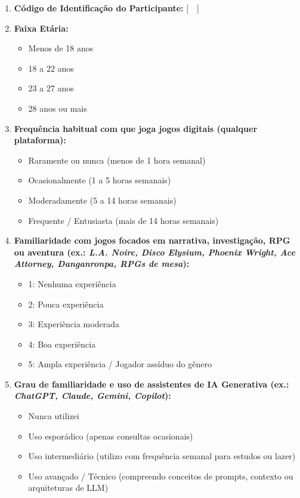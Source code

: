 \begin{enumerate}[label=\textbf{P\arabic*.}, noitemsep, topsep=1pt, parsep=0pt]
    \item \textbf{Código de Identificação do Participante:} [\ \underline{\hspace{4cm}}\ ]
    \item \textbf{Faixa Etária:}
    \begin{itemize}[label={$\square$}, noitemsep, topsep=1pt, parsep=0pt]
        \item Menos de 18 anos
        \item 18 a 22 anos
        \item 23 a 27 anos
        \item 28 anos ou mais
    \end{itemize}
    \item \textbf{Frequência habitual com que joga jogos digitais (qualquer plataforma):}
    \begin{itemize}[label={$\square$}, noitemsep, topsep=1pt, parsep=0pt]
        \item Raramente ou nunca (menos de 1 hora semanal)
        \item Ocasionalmente (1 a 5 horas semanais)
        \item Moderadamente (5 a 14 horas semanais)
        \item Frequente / Entusiasta (mais de 14 horas semanais)
    \end{itemize}
    \item \textbf{Familiaridade com jogos focados em narrativa, investigação, RPG ou aventura (ex.: \textit{L.A. Noire, Disco Elysium, Phoenix Wright, Ace Attorney, Danganronpa, RPGs de mesa}):}
    \begin{itemize}[label={$\square$}, noitemsep, topsep=1pt, parsep=0pt]
        \item 1: Nenhuma experiência
        \item 2: Pouca experiência
        \item 3: Experiência moderada
        \item 4: Boa experiência
        \item 5: Ampla experiência / Jogador assíduo do gênero
    \end{itemize}
    \item \textbf{Grau de familiaridade e uso de assistentes de IA Generativa (ex.: \textit{ChatGPT, Claude, Gemini, Copilot}):}
    \begin{itemize}[label={$\square$}, noitemsep, topsep=1pt, parsep=0pt]
        \item Nunca utilizei
        \item Uso esporádico (apenas consultas ocasionais)
        \item Uso intermediário (utilizo com frequência semanal para estudos ou lazer)
        \item Uso avançado / Técnico (compreendo conceitos de prompts, contexto ou arquiteturas de LLM)
    \end{itemize}
\end{enumerate}

